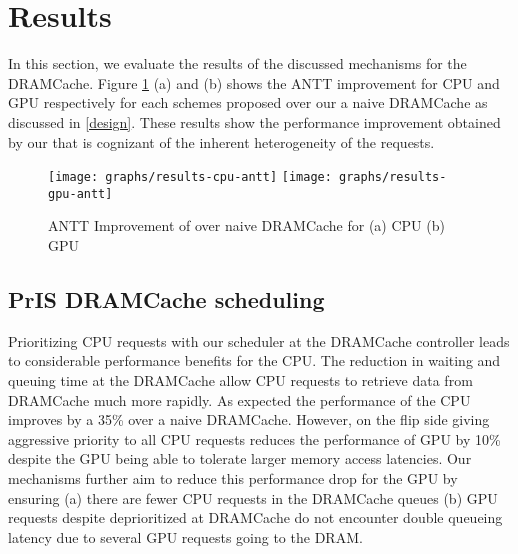 \section{Results} \label{results}
In this section, we evaluate the results of the discussed mechanisms for the DRAMCache. Figure \ref{results-antt-graph} (a) and (b) shows the ANTT improvement for CPU and GPU respectively for each schemes proposed over our a naive DRAMCache as discussed in \ref{design}. These results show the performance improvement obtained by our \cachename that is cognizant of the inherent heterogeneity of the requests.
\begin{figure}[!htb]
    \centering
    \texttt{[image: graphs/results-cpu-antt]}
    \texttt{[image: graphs/results-gpu-antt]}
    \caption{ANTT Improvement of \cachename over naive DRAMCache for (a) CPU (b) GPU}
    \label{results-antt-graph}
\end{figure}

\subsection{PrIS DRAMCache scheduling}
Prioritizing CPU requests with our \prioname scheduler at the DRAMCache controller leads to considerable performance benefits for the CPU. The reduction in waiting and queuing time at the DRAMCache allow CPU requests to retrieve data from DRAMCache much more rapidly. As expected the performance of the CPU improves by a 35\% over a naive DRAMCache. However, on the flip side giving aggressive priority to all CPU requests reduces the performance of GPU by 10\% despite the GPU being able to tolerate larger memory access latencies. Our mechanisms further aim to reduce this performance drop for the GPU by ensuring (a) there are fewer CPU requests in the DRAMCache queues (b) GPU requests despite deprioritized at DRAMCache do not encounter double queueing latency due to several GPU requests going to the DRAM.
